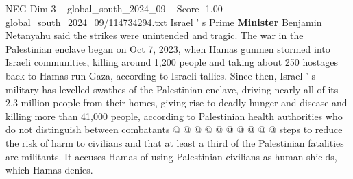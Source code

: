 \begin{textsample}{NEG Dim 3 – global\_south\_2024\_09 – Score -1.00 – global\_south\_2024\_09/114734294.txt}
Israel ' s Prime \textbf{Minister} Benjamin Netanyahu said the strikes were unintended and tragic.
The war in the Palestinian enclave began on Oct 7, 2023, when Hamas gunmen stormed into Israeli communities, killing around 1,200 people and taking about 250 hostages back to Hamas-run Gaza, according to Israeli tallies.
Since then, Israel ' s military has levelled swathes of the Palestinian enclave, driving nearly all of its 2.3 million people from their homes, giving rise to deadly hunger and disease and killing more than 41,000 people, according to Palestinian health authorities who do not distinguish between combatants @ @ @ @ @ @ @ @ @ @ steps to reduce the risk of harm to civilians and that at least a third of the Palestinian fatalities are militants.
It accuses Hamas of using Palestinian civilians as human shields, which Hamas denies.

\end{textsample}
